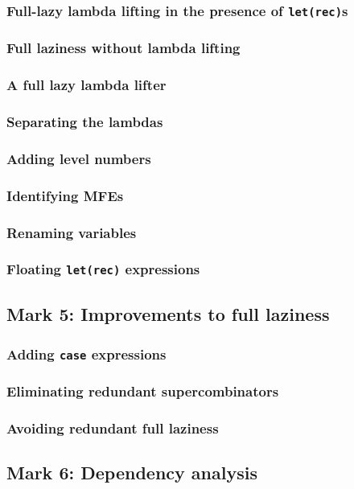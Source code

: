 \documentclass{jarticle}
\begin{document}
\subsubsection{Full-lazy lambda lifting in the presence of \texttt{let(rec)}s}
\subsubsection{Full laziness without lambda lifting}
\subsubsection{A full lazy lambda lifter}
\subsubsection{Separating the lambdas}
\subsubsection{Adding level numbers}
\subsubsection{Identifying MFEs}
\subsubsection{Renaming variables}
\subsubsection{Floating \texttt{let(rec)} expressions}
\newpage

\subsection{Mark 5: Improvements to full laziness}
\subsubsection{Adding \texttt{case} expressions}
\subsubsection{Eliminating redundant supercombinators}
\subsubsection{Avoiding redundant full laziness}
\newpage

\subsection{Mark 6: Dependency analysis \dag}
\end{document}
